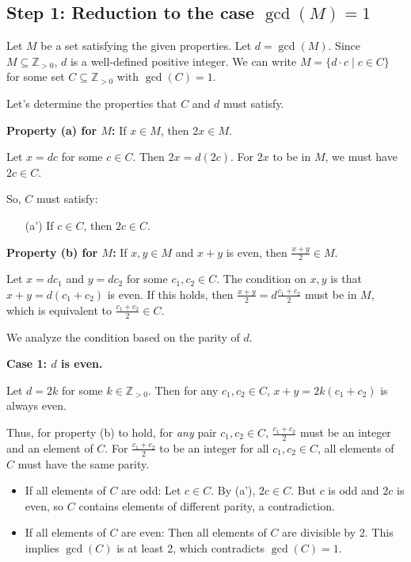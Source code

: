 \documentclass[12pt,a4paper]{article}
\theoremstyle{definition}
\begin{document}
        \subsection*{Step 1: Reduction to the case $\gcd(M)=1$}

        Let $M$ be a set satisfying the given properties. Let $d = \gcd(M)$. Since $M \subseteq \mathbb{Z}_{>0}$, $d$ is a well-defined positive integer. We can write $M = \{d \cdot c \mid c \in C\}$ for some set $C \subseteq \mathbb{Z}_{>0}$ with $\gcd(C)=1$.

        Let's determine the properties that $C$ and $d$ must satisfy.

        \textbf{Property (a) for $M$:} If $x \in M$, then $2x \in M$.

        Let $x = dc$ for some $c \in C$. Then $2x = d(2c)$. For $2x$ to be in $M$, we must have $2c \in C$.

        So, $C$ must satisfy:
        \begin{enumerate}
            \item[(a')] If $c \in C$, then $2c \in C$.
        \end{enumerate}

        \textbf{Property (b) for $M$:} If $x, y \in M$ and $x+y$ is even, then $\frac{x+y}{2} \in M$.

        Let $x=dc_1$ and $y=dc_2$ for some $c_1, c_2 \in C$. The condition on $x,y$ is that $x+y = d(c_1+c_2)$ is even. If this holds, then $\frac{x+y}{2} = d\frac{c_1+c_2}{2}$ must be in $M$, which is equivalent to $\frac{c_1+c_2}{2} \in C$.

        We analyze the condition based on the parity of $d$.

        \textbf{Case 1: $d$ is even.}

        Let $d=2k$ for some $k \in \mathbb{Z}_{>0}$. Then for any $c_1, c_2 \in C$, $x+y = 2k(c_1+c_2)$ is always even.

        Thus, for property (b) to hold, for \emph{any} pair $c_1, c_2 \in C$, $\frac{c_1+c_2}{2}$ must be an integer and an element of $C$. For $\frac{c_1+c_2}{2}$ to be an integer for all $c_1, c_2 \in C$, all elements of $C$ must have the same parity.

        \begin{itemize}
            \item If all elements of $C$ are odd: Let $c \in C$. By (a'), $2c \in C$. But $c$ is odd and $2c$ is even, so $C$ contains elements of different parity, a contradiction.
            \item If all elements of $C$ are even: Then all elements of $C$ are divisible by 2. This implies $\gcd(C)$ is at least 2, which contradicts $\gcd(C)=1$.
        \end{itemize}
\end{document}
